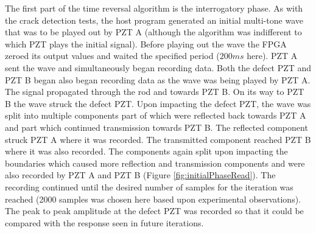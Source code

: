 The first part of the time reversal algorithm is the interrogatory phase. As with the crack detection tests, the host program generated an initial multi-tone wave that was to be played out by PZT A (although the algorithm was indifferent to which PZT plays the initial signal). Before playing out the wave the FPGA zeroed its output values and waited the specified period ($200ms$ here). PZT A sent the wave and simultaneously began recording data. Both the defect PZT and PZT B began also began recording data as the wave was being played by PZT A. The signal propagated through the rod and towards PZT B. On its way to PZT B the wave struck the defect PZT. Upon impacting the defect PZT, the wave was split into multiple components part of which were reflected back towards PZT A and part which continued transmission towards PZT B. The reflected component struck PZT A where it was recorded. The transmitted component reached PZT B where it was also recorded. The components again split upon impacting the boundaries which caused more reflection and transmission components and were also recorded by PZT A and PZT B (Figure \ref{fig:initialPhaseRead}). The recording continued until the desired number of samples for the iteration was reached (2000 samples was chosen here based upon experimental observations). The peak to peak amplitude at the defect PZT was recorded so that it could be compared with the response seen in future iterations.


